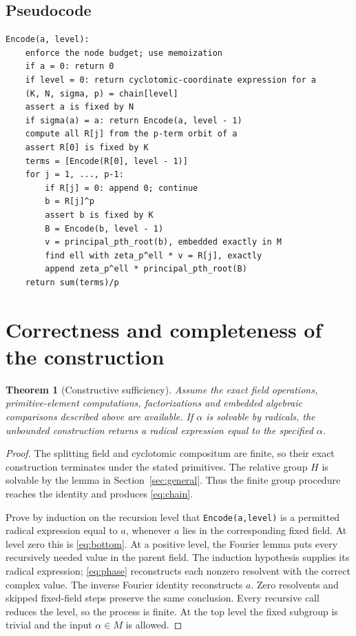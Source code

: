 \documentclass[11pt,letterpaper]{article}
\newcommand{\code}[1]{\texttt{#1}}
\newtheorem{theorem}{Theorem}[section]
\theoremstyle{definition}\newtheorem{definition}[theorem]{Definition}
\theoremstyle{remark}\newtheorem{remark}[theorem]{Remark}
\begin{document}
\subsection{Pseudocode}

\begin{lstlisting}
Encode(a, level):
    enforce the node budget; use memoization
    if a = 0: return 0
    if level = 0: return cyclotomic-coordinate expression for a
    (K, N, sigma, p) = chain[level]
    assert a is fixed by N
    if sigma(a) = a: return Encode(a, level - 1)
    compute all R[j] from the p-term orbit of a
    assert R[0] is fixed by K
    terms = [Encode(R[0], level - 1)]
    for j = 1, ..., p-1:
        if R[j] = 0: append 0; continue
        b = R[j]^p
        assert b is fixed by K
        B = Encode(b, level - 1)
        v = principal_pth_root(b), embedded exactly in M
        find ell with zeta_p^ell * v = R[j], exactly
        append zeta_p^ell * principal_pth_root(B)
    return sum(terms)/p
\end{lstlisting}

\section{Correctness and completeness of the construction}

\begin{theorem}[Constructive sufficiency]
Assume the exact field operations, primitive-element computations,
factorizations and embedded algebraic comparisons described above are
available. If \(\alpha\) is solvable by radicals, the unbounded construction
returns a radical expression equal to the specified \(\alpha\).
\end{theorem}
\begin{proof}
The splitting field and cyclotomic compositum are finite, so their exact
construction terminates under the stated primitives. The relative group
\(H\) is solvable by the lemma in Section~\ref{sec:general}. Thus the finite
group procedure reaches the identity and produces \eqref{eq:chain}.

Prove by induction on the recursion level that \code{Encode(a,level)} is a
permitted radical expression equal to \(a\), whenever \(a\) lies in the
corresponding fixed field. At level zero this is \eqref{eq:bottom}.
At a positive level, the Fourier lemma puts every recursively needed value
in the parent field. The induction hypothesis supplies its radical expression;
\eqref{eq:phase} reconstructs each nonzero resolvent with the correct complex
value. The inverse Fourier identity reconstructs \(a\). Zero resolvents and
skipped fixed-field steps preserve the same conclusion. Every recursive call
reduces the level, so the process is finite. At the top level the fixed
subgroup is trivial and the input \(\alpha\in M\) is allowed.
\end{proof}
\end{document}
